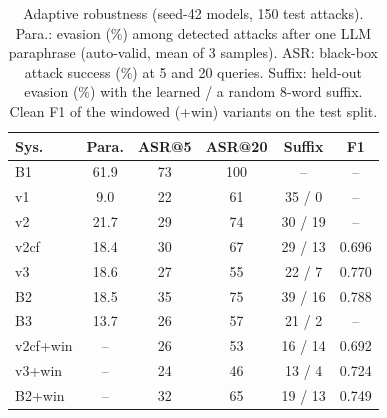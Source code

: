 \begin{table}[t]
\centering
\caption{Adaptive robustness (seed-42 models, 150 test attacks). Para.: evasion (\%) among detected attacks after one LLM paraphrase (auto-valid, mean of 3 samples). ASR: black-box attack success (\%) at 5 and 20 queries. Suffix: held-out evasion (\%) with the learned / a random 8-word suffix. Clean F1 of the windowed (+win) variants on the test split.}
\label{tab:attacks}
\small
\setlength{\tabcolsep}{3pt}
\begin{tabular}{lccccc}
\toprule
\textbf{Sys.} & \textbf{Para.} & \textbf{ASR@5} & \textbf{ASR@20} & \textbf{Suffix} & \textbf{F1} \\
\midrule
B1 & 61.9 & 73 & 100 & -- & -- \\
v1 & 9.0 & 22 & 61 & 35 / 0 & -- \\
v2 & 21.7 & 29 & 74 & 30 / 19 & -- \\
v2cf & 18.4 & 30 & 67 & 29 / 13 & 0.696 \\
v3 & 18.6 & 27 & 55 & 22 / 7 & 0.770 \\
B2 & 18.5 & 35 & 75 & 39 / 16 & 0.788 \\
B3 & 13.7 & 26 & 57 & 21 / 2 & -- \\
v2cf+win & -- & 26 & 53 & 16 / 14 & 0.692 \\
v3+win & -- & 24 & 46 & 13 / 4 & 0.724 \\
B2+win & -- & 32 & 65 & 19 / 13 & 0.749 \\
\bottomrule
\end{tabular}
\end{table}
